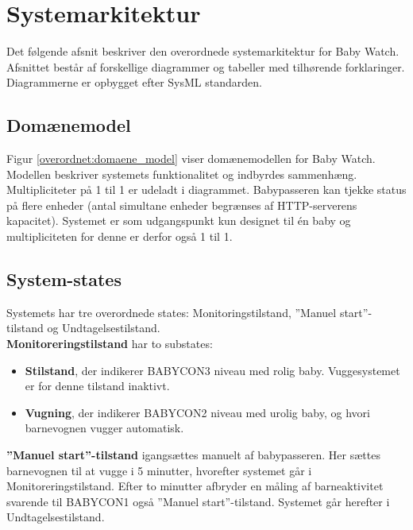 \section{Systemarkitektur}

Det følgende afsnit beskriver den overordnede systemarkitektur for Baby Watch. Afsnittet består af forskellige diagrammer og tabeller med tilhørende forklaringer. Diagrammerne er opbygget efter SysML standarden.

\subsection{Domænemodel}

Figur \ref{overordnet:domaene_model} viser domænemodellen for Baby Watch. Modellen beskriver systemets funktionalitet og indbyrdes sammenhæng. Multipliciteter på 1 til 1 er udeladt i diagrammet. Babypasseren kan tjekke status på flere enheder (antal simultane enheder begrænses af HTTP-serverens kapacitet). Systemet er som udgangspunkt kun designet til én baby og multipliciteten for denne er derfor også 1 til 1.

\subsection{System-states}

Systemets har tre overordnede states: Monitoringstilstand, ''Manuel start''-tilstand og Undtagelsestilstand. \\\textbf{Monitoreringstilstand} har to substates: 
\begin{itemize}
	\item \textbf{Stilstand}, der indikerer BABYCON3 niveau med rolig baby. Vuggesystemet er for denne tilstand inaktivt.
	\item \textbf{Vugning}, der indikerer BABYCON2 niveau med urolig baby, og hvori barnevognen vugger automatisk.
\end{itemize}

\textbf{''Manuel start''-tilstand} igangsættes manuelt af babypasseren. Her sættes barnevognen til at vugge i 5 minutter, hvorefter systemet går i Monitoreringstilstand. Efter to minutter afbryder en måling af barneaktivitet svarende til BABYCON1 også ''Manuel start''-tilstand. Systemet går herefter i Undtagelsestilstand.

